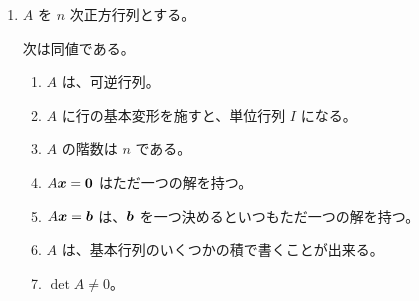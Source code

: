 \begin{enumerate}
\item $A$ を $n$ 次正方行列とする。

 次は同値である。
		\begin{enumerate}
		\item $A$ は、可逆行列。
		\item $A$ に行の基本変形を施すと、単位行列 $I$ になる。
		\item $A$ の階数は $n$ である。
		\item $A\mbox{\boldmath $x$} = \mbox{\boldmath $0$}$ はただ一つの解を持つ。
		\item $A\mbox{\boldmath $x$} = \mbox{\boldmath $b$}$ は、$\mbox{\boldmath $b$}$ を一つ決めるといつもただ一つの解を持つ。
		\item $A$ は、基本行列のいくつかの積で書くことが出来る。
		\item $\det A \neq 0$。
		\end{enumerate}
\end{enumerate}

